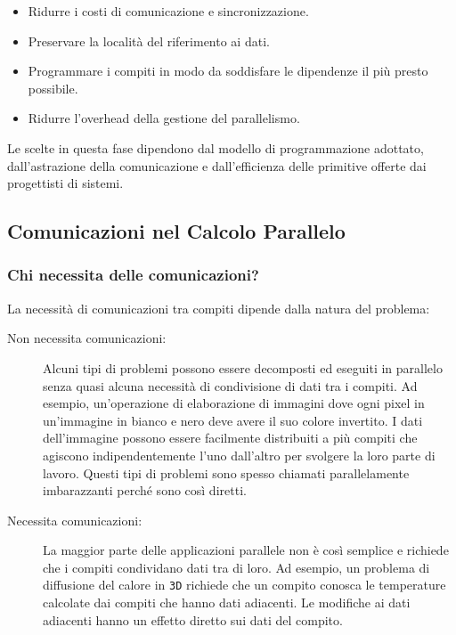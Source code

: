 \begin{itemize}
    \item Ridurre i costi di comunicazione e
    sincronizzazione.
    \item Preservare la località del riferimento ai dati.
    \item Programmare i compiti in modo da soddisfare
    le dipendenze il più presto possibile.
    \item Ridurre l'overhead della gestione del
    parallelismo.
\end{itemize}

Le scelte in questa fase dipendono dal modello di
programmazione adottato, dall'astrazione della
comunicazione e dall'efficienza delle primitive offerte
dai progettisti di sistemi.

\subsection{Comunicazioni nel Calcolo Parallelo}

\subsubsection{Chi necessita delle comunicazioni?}
La necessità di comunicazioni tra compiti dipende
dalla natura del problema:

\begin{description}
    \item[Non necessita comunicazioni:] Alcuni tipi
    di problemi possono essere decomposti ed eseguiti
    in parallelo senza quasi alcuna necessità di
    condivisione di dati tra i compiti. Ad esempio,
    un'operazione di elaborazione di immagini dove ogni
    pixel in un'immagine in bianco e nero deve avere
    il suo colore invertito. I dati dell'immagine possono
    essere facilmente distribuiti a più compiti che
    agiscono indipendentemente l'uno dall'altro per
    svolgere la loro parte di lavoro. Questi tipi di
    problemi sono spesso chiamati parallelamente
    imbarazzanti perché sono così diretti.
    \item[Necessita comunicazioni:] La maggior parte
    delle applicazioni parallele non è così semplice e
    richiede che i compiti condividano dati tra di loro.
    Ad esempio, un problema di diffusione del calore in
    \texttt{3D} richiede che un compito conosca le
    temperature calcolate dai compiti che hanno dati
    adiacenti. Le modifiche ai dati adiacenti hanno un
    effetto diretto sui dati del compito.
\end{description}

